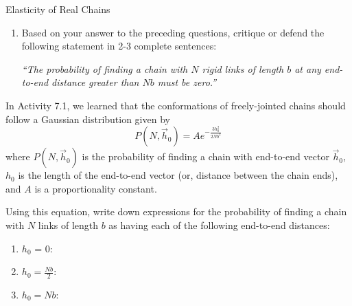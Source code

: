 \begin{activity}[extension]{Elasticity of Real Chains}
\begin{ctqs}
\begin{enumerate}
			\item Based on your answer to the preceding questions, critique or defend the following statement in 2-3 complete sentences: \label{\labelbase:ctq:probgtNb}
			
				\emph{``The probability of finding a chain with $N$ rigid links of length $b$ at any end-to-end distance greater than $Nb$ must be zero.''}
			
				\begin{solution}[1.5in]
				\end{solution}
			
		\end{enumerate}
	
\end{ctqs}

\begin{infobox}
	In Activity 7.1, we learned that the conformations of freely-jointed chains should follow a Gaussian distribution given by
	\begin{equation*}
		P(N,\vec h_0) = A e^{-\frac{3 h_0^2}{2 N b^2}}
	\end{equation*}
	where $P(N,\vec h_0)$ is the probability of finding a chain with end-to-end vector $\vec h_0$,  $h_0$ is the length of the end-to-end vector (or, distance between the chain ends), and $A$ is a proportionality constant.
	
\end{infobox}

\begin{ctqs}
		
		\question Using this equation, write down expressions for the probability of finding a chain with $N$ links of length $b$ as having each of the following end-to-end distances:
		
			\begin{enumerate}
			
				\item $h_0$ = 0:
			
				\begin{solution}[0.25in]
				\end{solution}
				
				\item $h_0 = \frac{Nb}{2}$:
			
				\begin{solution}[0.25in]
				\end{solution}
				
				\item $h_0 = Nb$:
			
				\begin{solution}[0.25in]
				\end{solution}
				

\end{enumerate}
\end{ctqs}
\end{activity}

